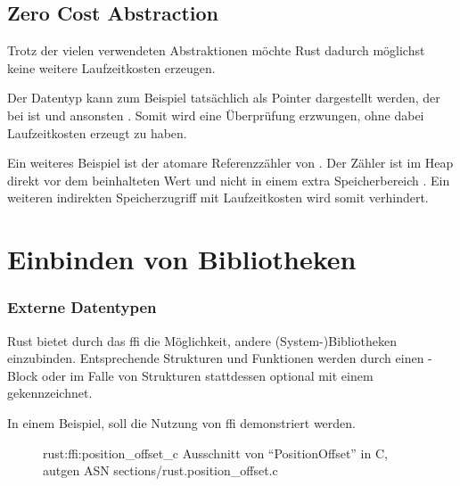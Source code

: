 \subsection{Zero Cost Abstraction}
\label{rust:zero_cost}

Trotz der vielen verwendeten Abstraktionen möchte Rust dadurch möglichst keine weitere Laufzeitkosten erzeugen.

Der  Datentyp kann zum Beispiel tatsächlich als Pointer dargestellt werden, der bei   ist und ansonsten  \cite[100]{rust:orly_programming}.
Somit wird eine Überprüfung erzwungen, ohne dabei Laufzeitkosten erzeugt zu haben.

Ein weiteres Beispiel ist der atomare Referenzzähler  von . Der Zähler ist im Heap direkt vor dem beinhalteten Wert und nicht in einem extra Speicherbereich .
Ein weiteren indirekten Speicherzugriff mit Laufzeitkosten wird somit verhindert.



\section{Einbinden von Bibliotheken}

\subsubsection{Externe Datentypen}
\label{rust:ffi}
\label{rust:ffi:datatypes}

Rust bietet durch das \gls{ffi} die Möglichkeit, andere (System-)Bibliotheken einzubinden.
Entsprechende Strukturen und Funktionen werden durch einen -Block
oder im Falle von Strukturen stattdessen optional mit einem \rustcinline{#[repr(C)]} gekennzeichnet.

In einem Beispiel, soll die Nutzung von \gls{ffi} demonstriert werden.

\begin{figure}[H]
	\ccinclude
		{rust:ffi:position_offset_c}
		{Ausschnitt von \enquote{PositionOffset}  in C, autgen ASN}
		{sections/rust.position_offset.c}
	
\end{figure}

